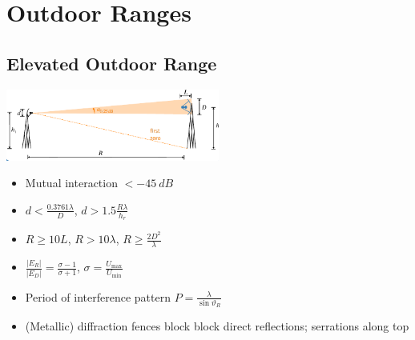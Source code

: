 \section{Outdoor Ranges}

\subsection{Elevated Outdoor Range}
\includegraphics[width=7cm]{content/at_meas/pictures/elevated_antenna_range}

\begin{itemize}
  \item Mutual interaction $< -\SI{45}{dB}$
  \item $d < \frac{0.3761\lambda}{D}$, $d > 1.5\frac{R\lambda}{h_{r}}$
  \item $R \geq 10L$, $R > 10\lambda$, $R \geq \frac{2D^{2}}{\lambda}$
  \item $\frac{|E_{R}|}{|E_{D}|} = \frac{\sigma - 1}{\sigma + 1}$, $\sigma = \frac{U_{\text{max}}}{U_{\text{min}}}$
  \item Period of interference pattern $P = \frac{\lambda}{\sin \vartheta_{R}}$
  \item (Metallic) diffraction fences block block direct reflections; serrations along top
\end{itemize}

